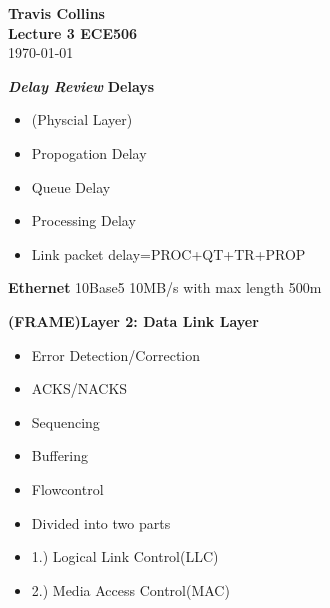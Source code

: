 \documentclass[12pt,letterpaper]{article}
\begin{document}
\linespread{1} %
\small \normalsize %
\begin{flushright}
\textbf{Travis Collins} \\
\textbf{Lecture 3 ECE506} \\
\today
\end{flushright}




\textbf{\textit{Delay Review}}
\textbf{Delays}
\begin{itemize}
\item (Physcial Layer)
\item Propogation Delay
\item Queue Delay
\item Processing Delay
\item Link packet delay=PROC+QT+TR+PROP
\end{itemize}


\textbf{Ethernet}
10Base5
10MB/s with max length 500m


\textbf{(FRAME)Layer 2: Data Link Layer} 
\begin{itemize}
\item Error Detection/Correction
\item ACKS/NACKS
\item Sequencing
\item Buffering
\item Flowcontrol
\item Divided into two parts
\item 1.) Logical Link Control(LLC)
\item 2.) Media Access Control(MAC)
\end{itemize}
\end{document}
